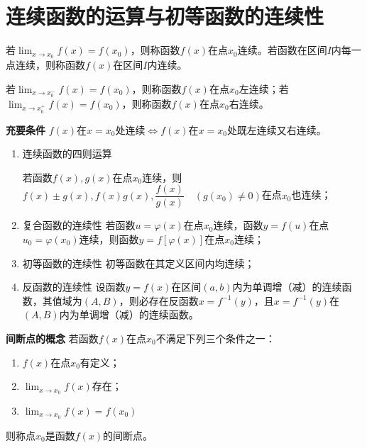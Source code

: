 \section{连续函数的运算与初等函数的连续性}
\begin{definition}[函数的连续性] \label{def:continuity}
    若$\displaystyle\lim_{x\rightarrow x_0} f(x) = f(x_0)$，则称函数$f(x)$在点$x_0$连续。若函数在区间$I$内每一点连续，则称函数$f(x)$在区间$I$内连续。

    若$\displaystyle\lim_{x\rightarrow x_0^-} f(x)=f(x_0)$，则称函数$f(x)$在点$x_0$左连续；若$\displaystyle\lim_{x\rightarrow x_0^+} f(x)=f(x_0)$，则称函数$f(x)$在点$x_0$右连续。
\end{definition}

\textbf{充要条件} \quad $f(x)$在$x=x_0$处连续$\Leftrightarrow f(x)$在$x=x_0$处既左连续又右连续。
\begin{theorem} \label{theorem:continuity}
    \begin{enumerate}
        \item 连续函数的四则运算 
        
        若函数$f(x),g(x)$在点$x_0$连续，则$f(x)\pm g(x),f(x)g(x),\dfrac{f(x)}{g(x)} \quad (g(x_0)\neq 0)$在点$x_0$也连续；

        \item 复合函数的连续性 \quad 若函数$u=\varphi(x)$在点$x_0$连续，函数$y=f(u)$在点$u_0=\varphi(x_0)$连续，则函数$y=f[\varphi(x)]$在点$x_0$连续；

        \item 初等函数的连续性 \quad 初等函数在其定义区间内均连续；

        \item 反函数的连续性 \quad 设函数$y=f(x)$在区间$(a,b)$内为单调增（减）的连续函数，其值域为$(A,B)$，则必存在反函数$x=f^{-1}(y)$，且$x=f^{-1}(y)$在$(A,B)$内为单调增（减）的连续函数。
    \end{enumerate}
\end{theorem}

\textbf{间断点的概念} \quad 若函数$f(x)$在点$x_0$不满足下列三个条件之一：
\begin{enumerate}
    \item $f(x)$在点$x_0$有定义；
    \item $\displaystyle\lim_{x\rightarrow x_0}f(x)$存在；
    \item $\displaystyle\lim_{x\rightarrow x_0}f(x)=f(x_0)$
\end{enumerate}

则称点$x_0$是函数$f(x)$的间断点。
~\\

